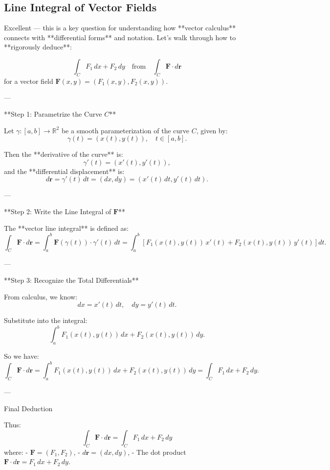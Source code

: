 \documentclass[11pt,openany]{article}
\renewcommand{\vec}[1]{\mathbf{#1}}
\begin{document}
\subsection*{Line Integral of Vector Fields}

Excellent — this is a key question for understanding how **vector calculus** connects with **differential forms** and notation. Let's walk through how to **rigorously deduce**:

\[
\int_C F_1\,dx + F_2\,dy
\quad \text{from} \quad
\int_C \vec{F} \cdot d\vec{r}
\]
for a vector field \( \vec{F}(x,y) = (F_1(x,y), F_2(x,y)) \).

---



 **Step 1: Parametrize the Curve \( C \)**

Let \( \gamma: [a, b] \to \mathbb{R}^2 \) be a smooth parameterization of the curve \( C \), given by:
\[
\gamma(t) = (x(t), y(t)), \quad t \in [a, b].
\]

Then the **derivative of the curve** is:
\[
\gamma'(t) = (x'(t), y'(t)),
\]
and the **differential displacement** is:
\[
d\vec{r} = \gamma'(t)\,dt = (dx, dy) = (x'(t)\,dt, y'(t)\,dt).
\]

---

 **Step 2: Write the Line Integral of \( \vec{F} \)**

The **vector line integral** is defined as:
\[
\int_C \vec{F} \cdot d\vec{r}
= \int_a^b \vec{F}(\gamma(t)) \cdot \gamma'(t)\,dt
= \int_a^b \left[ F_1(x(t), y(t))\,x'(t) + F_2(x(t), y(t))\,y'(t) \right] dt.
\]

---

 **Step 3: Recognize the Total Differentials**

From calculus, we know:
\[
dx = x'(t)\,dt, \quad dy = y'(t)\,dt.
\]

Substitute into the integral:
\[
\int_a^b F_1(x(t), y(t))\,dx + F_2(x(t), y(t))\,dy.
\]

So we have:
\[
\int_C \vec{F} \cdot d\vec{r}
= \int_a^b F_1(x(t), y(t))\,dx + F_2(x(t), y(t))\,dy
= \int_C F_1\,dx + F_2\,dy.
\]

---

Final Deduction

Thus:
\[
\boxed{
	\int_C \vec{F} \cdot d\vec{r}
	= \int_C F_1\,dx + F_2\,dy
}
\]
where:
- \( \vec{F} = (F_1, F_2) \),
- \( d\vec{r} = (dx, dy) \),
- The dot product \( \vec{F} \cdot d\vec{r} = F_1\,dx + F_2\,dy \).
\end{document}
